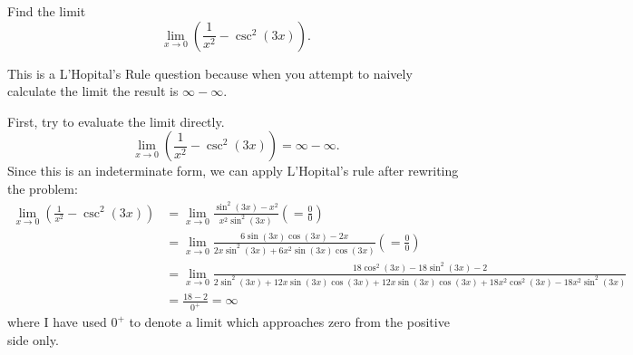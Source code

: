 \documentclass{ximera}
\author{Emma Smith Zbarsky}
\begin{document}
\begin{exercise}

Find the limit \[\lim_{x \to 0} \left(\frac{1}{x^2}- \csc^2(3x)\right).\]


\begin{hint}
This is a L'Hopital's Rule question because when you attempt to naively
calculate the limit the result is $\infty-\infty$.
\end{hint}


\begin{hint}
First, try to evaluate the limit directly.
\[\lim_{x\to 0} \left(\frac{1}{x^2} - \csc^2(3x)\right) = \infty-\infty.\] Since this
is an indeterminate form, we can apply L'Hopital's rule after rewriting
the problem: \begin{align*}
\lim_{x\to 0} \left(\frac{1}{x^2}-\csc^2(3x) \right)&= \lim_{x\to 0} \frac{\sin^2(3x)-x^2}{x^2\sin^2(3x)} \left( = \frac{0}{0}\right)\\
&=  \lim_{x\to 0} \frac{6\sin(3x)\cos(3x)-2x}{2x\sin^2(3x)+6x^2\sin(3x)\cos(3x)} \left( =\frac{0}{0}\right) \\
&= \lim_{x\to 0} \frac{18\cos^2(3x)-18\sin^2(3x)-2}{2\sin^2(3x)+12x\sin(3x)\cos(3x)+12x\sin(3x)\cos(3x) + 18x^2\cos^2(3x)-18x^2\sin^2(3x)} \\
&= \frac{18-2}{0^+} = \infty
\end{align*} where I have used $0^+$ to denote a limit which
approaches zero from the positive side only.
\end{hint}


\begin{multipleChoice}
\choice{$-\infty$}
\choice[correct]{$\infty$}
\end{multipleChoice}

\end{exercise}
\end{document}

